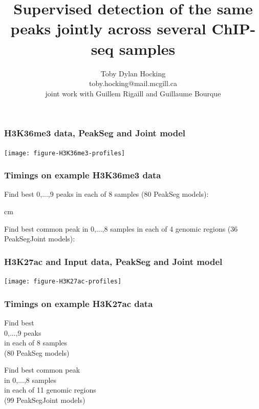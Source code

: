 \documentclass{beamer}
\begin{document}
\title{Supervised detection of the same peaks jointly across 
  several ChIP-seq samples}

\author{
  Toby Dylan Hocking\\
  toby.hocking@mail.mcgill.ca\\
  joint work with Guillem Rigaill and Guillaume Bourque}


\maketitle



\begin{frame}
  \frametitle{H3K36me3 data, PeakSeg and Joint model}

  \texttt{[image: figure-H3K36me3-profiles]}
\end{frame}

\begin{frame}
  \frametitle{Timings on example H3K36me3 data}

  \small

  Find best 0,...,9 peaks in each of 8 samples (80 PeakSeg
  models):

  

   cm

  Find best common peak in 0,...,8 samples in each of 4 genomic
  regions (36 PeakSegJoint models):

  

\end{frame}

\begin{frame}
  \frametitle{H3K27ac and Input data, PeakSeg and Joint model}

  \texttt{[image: figure-H3K27ac-profiles]}
\end{frame}

\begin{frame}
  \frametitle{Timings on example H3K27ac data}

  \scriptsize

  \parbox{2in}{
    Find best \\
  0,...,9 peaks\\
  in each of 8 samples\\
  (80 PeakSeg models)

  
  }
  \parbox{2in}{
  Find best common peak\\
  in 0,...,8 samples\\
  in each of 11 genomic regions\\
  (99 PeakSegJoint models)

  
  }

\end{frame}
\end{document}
